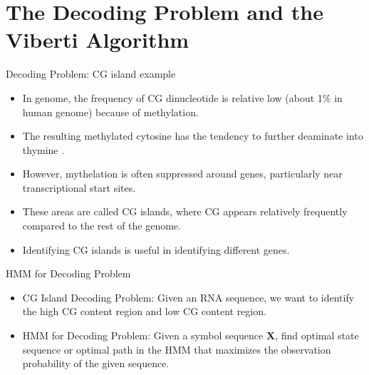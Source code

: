 \documentclass{beamer}
\begin{document}
\section{The Decoding Problem and the Viberti Algorithm}
\begin{frame}{Decoding Problem: CG island example}
	\begin{itemize}
		\item In genome, the frequency of CG dinucleotide is relative low (about 1\% in human genome) because of methylation. 
		\item The resulting methylated cytosine has the tendency to further deaminate into thymine \cite{compeau2018bioinformatics}.
		\item However, mythelation is often suppressed around genes, particularly near transcriptional start sites.
		\item These areas are called CG islands, where CG appears relatively frequently compared to the rest of the genome.
		\item Identifying CG islands is useful in identifying different genes.
	\end{itemize}
\end{frame}

\begin{frame}{HMM for Decoding Problem}
	\begin{itemize}
		\item CG Island Decoding Problem: Given an RNA sequence, we want to identify the high CG content region and low CG content region.
		\item HMM for Decoding Problem: Given a symbol sequence \textbf{X}, find optimal state sequence or optimal path in the HMM that maximizes the observation probability of the given sequence.
	\end{itemize}
\end{frame}
\end{document}

